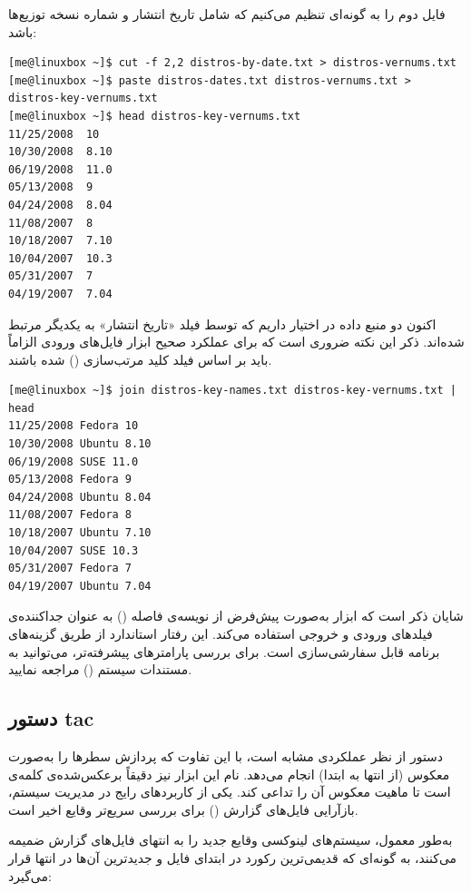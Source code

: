فایل دوم را به گونه‌ای تنظیم می‌کنیم که شامل تاریخ انتشار و شماره نسخه توزیع‌ها باشد:

\begin{latin}
\begin{lstlisting}
[me@linuxbox ~]$ cut -f 2,2 distros-by-date.txt > distros-vernums.txt
[me@linuxbox ~]$ paste distros-dates.txt distros-vernums.txt > distros-key-vernums.txt
[me@linuxbox ~]$ head distros-key-vernums.txt
11/25/2008	10
10/30/2008	8.10
06/19/2008	11.0
05/13/2008	9
04/24/2008	8.04
11/08/2007	8
10/18/2007	7.10
10/04/2007	10.3
05/31/2007	7
04/19/2007	7.04
\end{lstlisting}
\end{latin}

اکنون دو منبع داده در اختیار داریم که توسط فیلد «تاریخ انتشار» به یکدیگر مرتبط شده‌اند. ذکر این نکته ضروری است که برای عملکرد صحیح ابزار  فایل‌های ورودی الزاماً باید بر اساس فیلد کلید مرتب‌سازی () شده باشند.

\begin{latin}
\begin{lstlisting}
[me@linuxbox ~]$ join distros-key-names.txt distros-key-vernums.txt | head
11/25/2008 Fedora 10
10/30/2008 Ubuntu 8.10
06/19/2008 SUSE 11.0
05/13/2008 Fedora 9
04/24/2008 Ubuntu 8.04
11/08/2007 Fedora 8
10/18/2007 Ubuntu 7.10
10/04/2007 SUSE 10.3
05/31/2007 Fedora 7
04/19/2007 Ubuntu 7.04
\end{lstlisting}
\end{latin}

شایان ذکر است که ابزار  به‌صورت پیش‌فرض از نویسه‌ی فاصله () به عنوان جداکننده‌ی فیلدهای ورودی و خروجی استفاده می‌کند. این رفتار استاندارد از طریق گزینه‌های برنامه قابل سفارشی‌سازی است. برای بررسی پارامترهای پیشرفته‌تر، می‌توانید به مستندات سیستم () مراجعه نمایید.

\subsection{دستور tac}

دستور  از نظر عملکردی مشابه  است، با این تفاوت که پردازش سطرها را به‌صورت معکوس (از انتها به ابتدا) انجام می‌دهد. نام این ابزار نیز دقیقاً برعکس‌شده‌ی کلمه‌ی  است تا ماهیت معکوس آن را تداعی کند. یکی از کاربردهای رایج  در مدیریت سیستم، بازآرایی فایل‌های گزارش () برای بررسی سریع‌تر وقایع اخیر است.

به‌طور معمول، سیستم‌های لینوکسی وقایع جدید را به انتهای فایل‌های گزارش ضمیمه می‌کنند، به گونه‌ای که قدیمی‌ترین رکورد در ابتدای فایل و جدیدترین آن‌ها در انتها قرار می‌گیرد:

